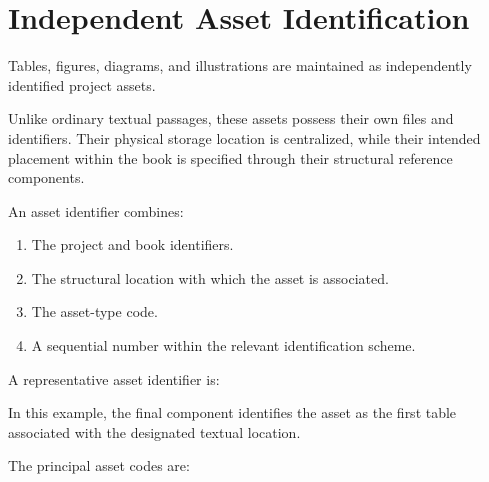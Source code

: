 
\section*{Independent Asset Identification}

Tables, figures, diagrams, and illustrations are maintained
as independently identified project assets.

Unlike ordinary textual passages, these assets possess
their own files and identifiers. Their physical storage
location is centralized, while their intended placement
within the book is specified through their structural
reference components.

An asset identifier combines:

\begin{enumerate}
    \item The project and book identifiers.
    \item The structural location with which the asset is
          associated.
    \item The asset-type code.
    \item A sequential number within the relevant
          identification scheme.
\end{enumerate}

A representative asset identifier is:

\begin{center}
\small
{}
\end{center}

In this example, the final component identifies the asset
as the first table associated with the designated textual
location.

The principal asset codes are:


